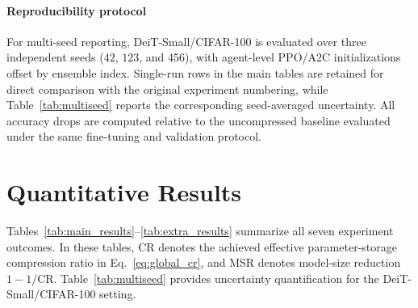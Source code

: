 \documentclass[preprint,12pt,authoryear]{elsarticle}
\begin{document}
\paragraph{Reproducibility protocol}
For multi-seed reporting, DeiT-Small/CIFAR-100 is evaluated over three independent seeds
($42$, $123$, and $456$), with agent-level PPO/A2C initializations offset by ensemble
index. Single-run rows in the main tables are retained for direct comparison with the
original experiment numbering, while Table~\ref{tab:multiseed} reports the corresponding
seed-averaged uncertainty. All accuracy drops are computed relative to the uncompressed
baseline evaluated under the same fine-tuning and validation protocol.

\section{Quantitative Results}
\label{sec:results}

Tables~\ref{tab:main_results}--\ref{tab:extra_results} summarize all seven experiment outcomes. In these tables, CR denotes the achieved effective parameter-storage compression ratio in Eq.~\eqref{eq:global_cr}, and MSR denotes model-size reduction $1-1/\mathrm{CR}$. Table~\ref{tab:multiseed} provides uncertainty quantification for the DeiT-Small/CIFAR-100 setting.
\end{document}
